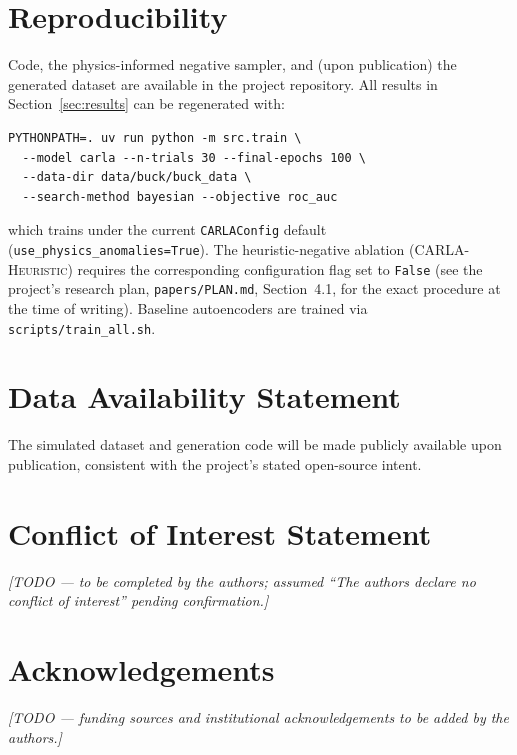 \documentclass[11pt,a4paper]{article}
\begin{document}
\section{Reproducibility}
\label{sec:reproducibility}

Code, the physics-informed negative sampler, and (upon publication) the generated dataset
are available in the project repository. All results in Section~\ref{sec:results} can be
regenerated with:
\begin{verbatim}
PYTHONPATH=. uv run python -m src.train \
  --model carla --n-trials 30 --final-epochs 100 \
  --data-dir data/buck/buck_data \
  --search-method bayesian --objective roc_auc
\end{verbatim}
which trains under the current \texttt{CARLAConfig} default
(\texttt{use\_physics\_anomalies=True}). The heuristic-negative ablation
(\textsc{CARLA-Heuristic}) requires the corresponding configuration flag set to
\texttt{False} (see the project's research plan, \texttt{papers/PLAN.md}, Section~4.1,
for the exact procedure at the time of writing). Baseline autoencoders are trained via
\texttt{scripts/train\_all.sh}.

\section*{Data Availability Statement}
The simulated dataset and generation code will be made publicly available upon
publication, consistent with the project's stated open-source intent.

\section*{Conflict of Interest Statement}
\textit{[TODO --- to be completed by the authors; assumed ``The authors declare no
conflict of interest'' pending confirmation.]}

\section*{Acknowledgements}
\textit{[TODO --- funding sources and institutional acknowledgements to be added by the
authors.]}



\end{document}
